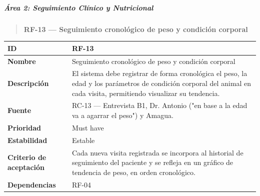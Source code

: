 \documentclass[
]{article}
\newcounter{none} %
\begin{document}
\subparagraph{Área 2: Seguimiento Clínico y
Nutricional}\label{uxe1rea-2-seguimiento-cluxednico-y-nutricional}

\begin{quote}
\textbf{RF-13 --- Seguimiento cronológico de peso y condición corporal}
\end{quote}

{\def\LTcaptype{none} %
\begin{longtable}[]{@{}
  >{\raggedright\arraybackslash}p{}
  >{\raggedright\arraybackslash}p{}@{}}
\toprule\noalign{}
\begin{minipage}[b]{\linewidth}\raggedright
\textbf{ID}
\end{minipage} & \begin{minipage}[b]{\linewidth}\raggedright
RF-13
\end{minipage} \\
\midrule\noalign{}
\endhead
\bottomrule\noalign{}
\endlastfoot
\textbf{Nombre} & \begin{minipage}[t]{\linewidth}\raggedright
Seguimiento cronológico de peso y condición corporal
\end{minipage} \\
\textbf{Descripción} & \begin{minipage}[t]{\linewidth}\raggedright
El sistema debe registrar de forma cronológica el peso, la edad y los
parámetros de condición corporal del animal en cada visita, permitiendo
visualizar su tendencia.
\end{minipage} \\
\textbf{Fuente} & \begin{minipage}[t]{\linewidth}\raggedright
RC-13 --- Entrevista B1, Dr. Antonio ("en base a la edad va a agarrar el
peso") y Amagua.
\end{minipage} \\
\textbf{Prioridad} & \begin{minipage}[t]{\linewidth}\raggedright
Must have
\end{minipage} \\
\textbf{Estabilidad} & \begin{minipage}[t]{\linewidth}\raggedright
Estable
\end{minipage} \\
\textbf{Criterio de aceptación} &
\begin{minipage}[t]{\linewidth}\raggedright
Cada nueva visita registrada se incorpora al historial de seguimiento
del paciente y se refleja en un gráfico de tendencia de peso, en orden
cronológico.
\end{minipage} \\
\textbf{Dependencias} & \begin{minipage}[t]{\linewidth}\raggedright
RF-04
\end{minipage} \\
\end{longtable}
}
\end{document}
